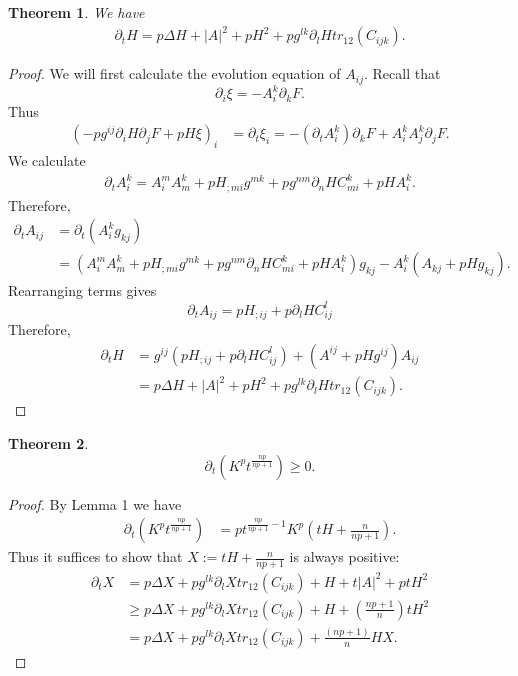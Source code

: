 \documentclass{amsart}
\newtheorem{theorem}{Theorem}
\theoremstyle{definition}
\theoremstyle{remark}
\numberwithin{equation}{section}
\begin{document}
\begin{theorem} We have
\begin{align*}
\partial_tH= p \Delta H+|A|^2+ p  H^2+ p  g^{lk}\partial_lH tr_{12}(C_{ijk}).
\end{align*}
\end{theorem}
\begin{proof}
We will first calculate the evolution equation of $A_{ij}.$ Recall that $$\partial_i\xi=-A_i^k\partial_kF.$$ Thus
\begin{align*}
\left(- p  g^{ij}\partial_iH\partial_jF+ p  H\xi\right)_i&=\partial_t\xi_i=-(\partial_tA_i^k)\partial_kF+A_i^kA_j^k\partial_jF.
\end{align*}
We calculate
\begin{align*}
\partial_tA_i^k=A_i^mA_m^k+ p  H_{;mi}g^{mk}+ p
g^{nm}\partial_n HC_{mi}^k+ p  HA_i^k.
\end{align*}
Therefore,
\begin{align*}
\partial_tA_{ij}&=\partial_t(A_i^kg_{kj})\\
&=\left(A_i^mA_m^k+ p  H_{;mi}g^{mk}+ p
g^{nm}\partial_n HC_{mi}^k+ p  HA_i^k\right)g_{kj}-A_i^k
(A_{kj}+ p  Hg_{kj}).
\end{align*}
Rearranging terms gives
\[\partial_t A_{ij}= p  H_{;ij}+ p \partial_lH C_{ij}^l\]
Therefore,
\begin{align*}
\partial_tH&=g^{ij}( p  H_{;ij}+ p  \partial_l HC^l_{ij})+(A^{ij}+ p  Hg^{ij})A_{ij}\\
&= p \Delta H+|A|^2+ p  H^2+ p  g^{lk}\partial_lH tr_{12}(C_{ijk}).
\end{align*}
\end{proof}
\begin{theorem}
\[\partial_t \left(K^{ p }t^{\frac{n p }{n p +1}}\right)\geq 0.\]
\end{theorem}
\begin{proof}
By Lemma 1 we have
\begin{align*}
\partial_t \left(K^{ p }t^{\frac{n p }{n p +1}}\right)&= p  t^{\frac{n p }{n p +1}-1}K^{ p }\left(tH+\frac{n}{n p +1}\right).
\end{align*}
Thus it suffices to show that $X:=tH+\frac{n}{n p +1}$ is always positive:
\begin{align*}
\partial_t X&= p \Delta X+ p  g^{lk}\partial_lX tr_{12}(C_{ijk})+H+t|A|^2+ p  t H^2\\
&\geq  p \Delta X+ p  g^{lk}\partial_lX tr_{12}(C_{ijk})+H+(\frac{n p +1}{n})t H^2\\
&= p \Delta X+ p  g^{lk}\partial_lX tr_{12}(C_{ijk})+\frac{(n p +1)}{n}HX.
\end{align*}
\end{proof}
\end{document}
